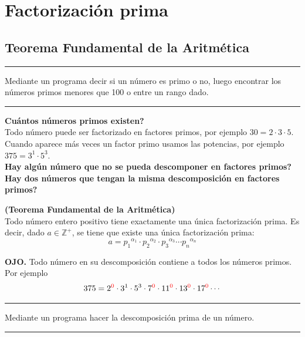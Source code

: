 \chapter{Factorización prima}\label{chapter:factorizacionPrima}

\section{Teorema Fundamental de la Aritmética}\label{section_TFA}
\rule{\textwidth}{0.1mm}
\begin{act}
	Mediante un programa decir si un número es primo o no, luego encontrar los números primos menores que 100 o entre un rango dado.
\end{act}
\rule{\textwidth}{0.1mm}

\textbf{Cuántos números primos existen?}\\


Todo número puede ser factorizado en factores primos, por ejemplo $30=2\cdot3\cdot5$. Cuando aparece más veces un factor primo usamos las potencias, por ejemplo $375=3^1\cdot5^3$.\\

\textbf{Hay algún número que no se pueda descomponer en factores primos?}\\
\textbf{Hay dos números que tengan la misma descomposición en factores primos?}\\

\begin{theorem} \textbf{(Teorema Fundamental de la Aritmética)}\\
	Todo número entero positivo tiene exactamente una única factorización prima. Es decir, dado $a\in {\mathbb{Z}}^{+}$, se tiene que existe una única factorización prima:
	\[a={p_1}^{\alpha_1} \cdot {p_2}^{\alpha_2} \cdot {p_3}^{\alpha_3} \cdots {p_n}^{\alpha_n} \]
\end{theorem}

\textbf{OJO. } Todo número en su descomposición contiene a todos los números primos. Por ejemplo
\[
		375=2^{\color{red}0}\color{black}\cdot 3^1\cdot5^3\cdot 7^{\color{red}0}\color{black}\cdot 11^{\color{red}0}\color{black}\cdot 13^{\color{red}0}\color{black}\cdot 17^{\color{red}0}\color{black}\cdots
\]
\rule{\textwidth}{0.1mm}
\begin{act}
	Mediante un programa hacer la descomposición prima de un número.
\end{act}
\rule{\textwidth}{0.1mm}


